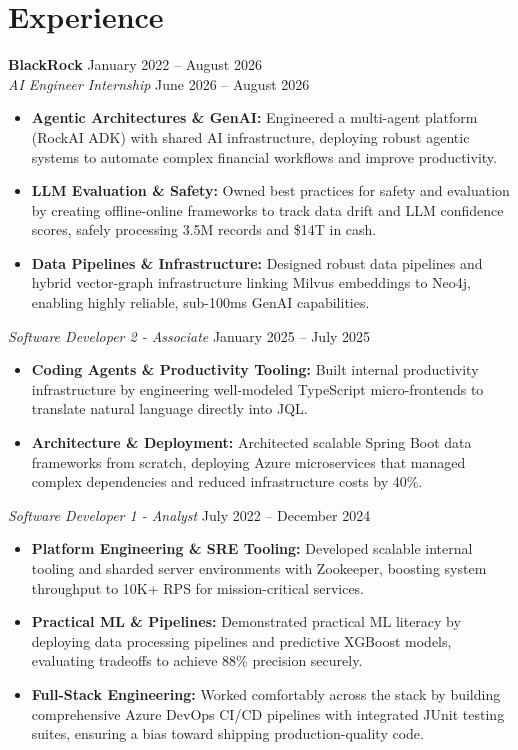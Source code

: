 \documentclass[11pt,a4paper]{article}
\begin{document}
\section{Experience}
\noindent
\textbf{BlackRock} \hfill January 2022 -- August 2026 \\
\textit{AI Engineer Internship} \hfill June 2026 -- August 2026
\begin{itemize}[leftmargin=*,noitemsep,topsep=0pt]
    \item \textbf{Agentic Architectures \& GenAI:} Engineered a multi-agent platform (RockAI ADK) with shared AI infrastructure, deploying robust agentic systems to automate complex financial workflows and improve productivity.
    \item \textbf{LLM Evaluation \& Safety:} Owned best practices for safety and evaluation by creating offline-online frameworks to track data drift and LLM confidence scores, safely processing 3.5M records and \$14T in cash.
    \item \textbf{Data Pipelines \& Infrastructure:} Designed robust data pipelines and hybrid vector-graph infrastructure linking Milvus embeddings to Neo4j, enabling highly reliable, sub-100ms GenAI capabilities.
\end{itemize}

\vspace{3pt}
\noindent
\textit{Software Developer 2 - Associate} \hfill January 2025 -- July 2025
\begin{itemize}[leftmargin=*,noitemsep,topsep=0pt]
    \item \textbf{Coding Agents \& Productivity Tooling:} Built internal productivity infrastructure by engineering well-modeled TypeScript micro-frontends to translate natural language directly into JQL.
    \item \textbf{Architecture \& Deployment:} Architected scalable Spring Boot data frameworks from scratch, deploying Azure microservices that managed complex dependencies and reduced infrastructure costs by 40\%.
\end{itemize}

\vspace{3pt}
\noindent
\textit{Software Developer 1 - Analyst} \hfill July 2022 -- December 2024
\begin{itemize}[leftmargin=*,noitemsep,topsep=0pt]
    \item \textbf{Platform Engineering \& SRE Tooling:} Developed scalable internal tooling and sharded server environments with Zookeeper, boosting system throughput to 10K+ RPS for mission-critical services.
    \item \textbf{Practical ML \& Pipelines:} Demonstrated practical ML literacy by deploying data processing pipelines and predictive XGBoost models, evaluating tradeoffs to achieve 88\% precision securely.
    \item \textbf{Full-Stack Engineering:} Worked comfortably across the stack by building comprehensive Azure DevOps CI/CD pipelines with integrated JUnit testing suites, ensuring a bias toward shipping production-quality code.
\end{itemize}
\end{document}
